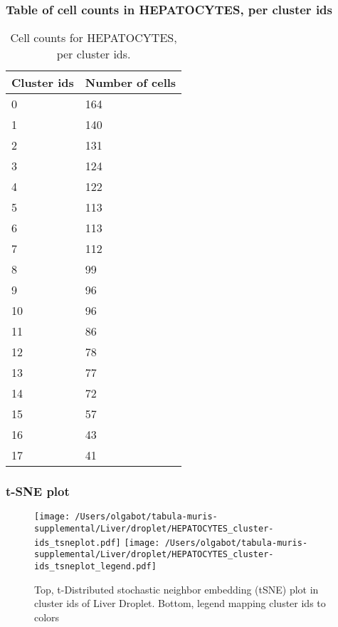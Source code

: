 \subsubsection{Table of cell counts in HEPATOCYTES, per cluster ids}\begin{table}[h]
\centering
\label{my-label}
\begin{tabular}{@{}ll@{}}
\toprule

Cluster ids& Number of cells \\ \midrule
0 & 164 \\

1 & 140 \\

2 & 131 \\

3 & 124 \\

4 & 122 \\

5 & 113 \\

6 & 113 \\

7 & 112 \\

8 & 99 \\

9 & 96 \\

10 & 96 \\

11 & 86 \\

12 & 78 \\

13 & 77 \\

14 & 72 \\

15 & 57 \\

16 & 43 \\

17 & 41 \\
\bottomrule
\end{tabular}
\caption{Cell counts for HEPATOCYTES, per cluster ids.}
\end{table}

\newpage
\subsubsection{t-SNE plot}
\begin{figure}[h]
\centering
\texttt{[image: /Users/olgabot/tabula-muris-supplemental/Liver/droplet/HEPATOCYTES\_cluster-ids\_tsneplot.pdf]}
\texttt{[image: /Users/olgabot/tabula-muris-supplemental/Liver/droplet/HEPATOCYTES\_cluster-ids\_tsneplot\_legend.pdf]}
\caption{Top, t-Distributed stochastic neighbor embedding (tSNE) plot  in cluster ids of Liver Droplet. Bottom, legend mapping cluster ids to colors}
\end{figure}


